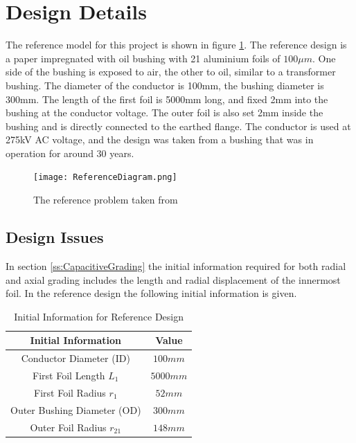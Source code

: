 
\section{Design Details}
The reference model for this project is shown in figure \ref{figure:refproblem}. 
The reference design is a paper impregnated with oil bushing with 21 aluminium foils of $100\mu m$.
One side of the bushing is exposed to air, the other to oil, similar to a transformer bushing.
The diameter of the conductor is 100mm, the bushing diameter is 300mm.
The length of the first foil is 5000mm long, and fixed 2mm into the bushing at the conductor voltage.
The outer foil is also set 2mm inside the bushing and is directly connected to the earthed flange.
The conductor is used at 275kV AC voltage, and the design was taken from a bushing that was in operation for around 30 years.
\begin{figure}[!h]
   \centering
   \texttt{[image: ReferenceDiagram.png]}
   \caption{The reference problem taken from \cite{Chen14}}
   \label{figure:refproblem}
\end{figure}

\subsection{Design Issues} \label{Section:Design Issues}
In section \ref{ss:CapacitiveGrading} the initial information required for both radial and axial grading includes the length and radial displacement of the innermost foil.
In the reference design the following initial information is given.

\begin{table}[!htb]
\caption{Initial Information for Reference Design}
\label{table:initinfo}
\begin{center}
\begin{tabular}{cc}
\toprule
\textbf{Initial Information} & \textbf{Value} \\ \toprule
Conductor Diameter (ID) & $100mm$ \\
First Foil Length $L_1$ & $5000mm$ \\
First Foil Radius $r_1$&$52mm$ \\
Outer Bushing Diameter (OD) & $300mm$\\
Outer Foil Radius $r_{21}$ & $148mm$\\
\bottomrule
\end{tabular}
\end{center}
\end{table} 

